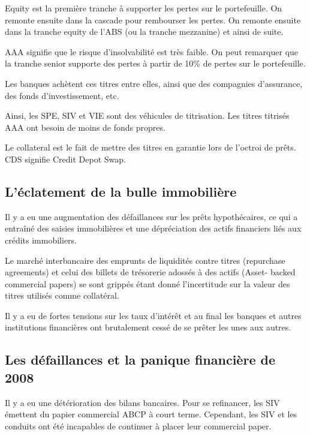 	Equity est la première tranche à supporter les pertes sur le portefeuille. On remonte ensuite dans la cascade pour rembourser les pertes. On remonte ensuite dans la tranche equity  de l'ABS (ou la tranche mezzanine) et ainsi de suite.
		
	
	AAA signifie que le risque d'insolvabilité est très faible. On peut remarquer que la tranche senior supporte des pertes à partir de 10\% de pertes sur le portefeuille.
	
	
	Les banques achètent ces titres entre elles, ainsi que des compagnies d'assurance, des fonds d'investissement, etc.
	
	Ainsi, les SPE, SIV et VIE sont des véhicules de titrisation. Les titres titrisés AAA ont besoin de moins de fonds propres.
		
	
	Le collateral est le fait de mettre des titres en garantie lors de l'octroi de prêts. CDS signifie Credit Depot Swap.
	
	\subsection{L'éclatement de la bulle immobilière}
	
	Il y a eu une augmentation des défaillances sur les prêts hypothécaires, ce qui a entraîné des saisies immobilières et une dépréciation des actifs financiers liés aux crédits immobiliers.
	
	Le marché interbancaire des emprunts de liquidités contre titres (repurchase agreements) et celui des billets de trésorerie adossés à des actifs (Asset- backed commercial papers) se sont grippés étant donné l'incertitude sur la valeur des titres utilisés comme collatéral. 

	Il y a eu de fortes tensions sur les taux d'intérêt et au final les banques et autres institutions financières ont brutalement cessé de se prêter les unes aux autres.
	
	\subsection{Les défaillances et la panique financière de 2008}
	
	Il y a eu une détérioration des bilans bancaires. Pour se refinancer, les SIV émettent du papier commercial ABCP à court terme. Cependant, les SIV et les conduits ont été incapables de continuer à placer leur commercial paper.

